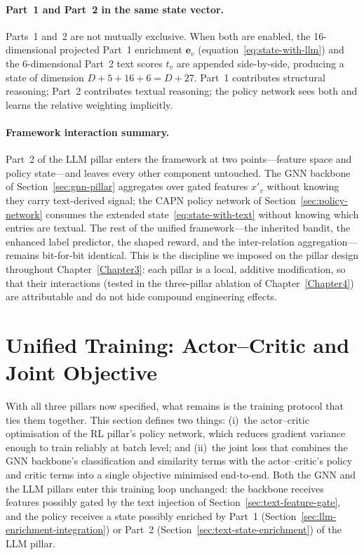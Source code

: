 \paragraph{Part~1 and Part~2 in the same state vector.} Parts~1 and~2 are not mutually exclusive. When both are enabled, the 16-dimensional projected Part~1 enrichment $\mathbf{e}_v$ (equation~\eqref{eq:state-with-llm}) and the 6-dimensional Part~2 text scores $t_v$ are appended side-by-side, producing a state of dimension $D + 5 + 16 + 6 = D + 27$. Part~1 contributes structural reasoning; Part~2 contributes textual reasoning; the policy network sees both and learns the relative weighting implicitly.

\paragraph{Framework interaction summary.} Part~2 of the LLM pillar enters the framework at two points---feature space and policy state---and leaves every other component untouched. The GNN backbone of Section~\ref{sec:gnn-pillar} aggregates over gated features $x'_v$ without knowing they carry text-derived signal; the CAPN policy network of Section~\ref{sec:policy-network} consumes the extended state~\eqref{eq:state-with-text} without knowing which entries are textual. The rest of the unified framework---the inherited bandit, the enhanced label predictor, the shaped reward, and the inter-relation aggregation---remains bit-for-bit identical. This is the discipline we imposed on the pillar design throughout Chapter~\ref{Chapter3}: each pillar is a local, additive modification, so that their interactions (tested in the three-pillar ablation of Chapter~\ref{Chapter4}) are attributable and do not hide compound engineering effects.

\section{Unified Training: Actor--Critic and Joint Objective}
\label{sec:unified-training}

With all three pillars now specified, what remains is the training protocol that ties them together. This section defines two things: (i)~the actor--critic optimisation of the RL pillar's policy network, which reduces gradient variance enough to train reliably at batch level; and (ii)~the joint loss that combines the GNN backbone's classification and similarity terms with the actor--critic's policy and critic terms into a single objective minimised end-to-end. Both the GNN and the LLM pillars enter this training loop unchanged: the backbone receives features possibly gated by the text injection of Section~\ref{sec:text-feature-gate}, and the policy receives a state possibly enriched by Part~1 (Section~\ref{sec:llm-enrichment-integration}) or Part~2 (Section~\ref{sec:text-state-enrichment}) of the LLM pillar.

